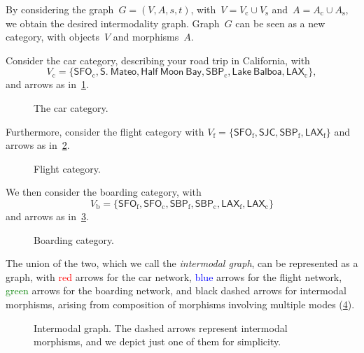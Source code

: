 By considering the graph~$G=(V,A,s,t)$, with~$V=V_\mathrm{c}\cup V_\mathrm{s}$ and~$A=A_\mathrm{c}\cup A_\mathrm{s}$, we obtain the desired intermodality graph. Graph~$G$ can be seen as a new category, with objects~$V$ and morphisms~$A$.
\begin{example}
Consider the car category, describing your road trip in California, with
\begin{equation*}
    V_\mathrm{c}=\{\mathsf{SFO}_\mathrm{c},\mathsf{S.}\ \mathsf{Mateo},\mathsf{Half} \ \mathsf{Moon}\ \mathsf{Bay},\mathsf{SBP}_\mathrm{c},\mathsf{Lake}\ \mathsf{Balboa},\mathsf{LAX}_\mathrm{c}\},
\end{equation*}
and arrows as in~\cref{fig:carcat}.

\begin{figure}[h!]
\begin{center}
\end{center}
\caption{The car category. \label{fig:carcat}}
\end{figure}

Furthermore, consider the flight category with $V_\mathrm{f}=\{\mathsf{SFO}_\mathrm{f},\mathsf{SJC},\mathsf{SBP}_\mathrm{f},\mathsf{LAX}_\mathrm{f}\}$ and arrows as in~\cref{fig:flight}.

\begin{figure}[h!]
\begin{center}
\end{center}
\caption{Flight category. \label{fig:flight}}
\end{figure}

We then consider the boarding category, with
\begin{equation*}
    V_\mathrm{b}=\{\mathsf{SFO}_\mathrm{f},\mathsf{SFO}_\mathrm{c},\mathsf{SBP}_\mathrm{f},\mathsf{SBP}_\mathrm{c},\mathsf{LAX}_\mathrm{f},\mathsf{LAX}_\mathrm{c}\}
\end{equation*}
and arrows as in~\cref{fig:boarding}.

\begin{figure}[h!]
\begin{center}
\end{center}
\caption{Boarding category. \label{fig:boarding}}
\end{figure}

The union of the two, which we call the \emph{intermodal graph}, can be represented as a graph, with \textcolor{red}{red} arrows for the car network, \textcolor{blue}{blue} arrows for the flight network, \textcolor{green}{green} arrows for the boarding network, and black dashed arrows for intermodal morphisms, arising from composition of morphisms involving multiple modes (\cref{fig:intermodal}).

\begin{figure}[h!]
\begin{center}
\end{center}
\caption{Intermodal graph. The dashed arrows represent intermodal morphisms, and we depict just one of them for simplicity. \label{fig:intermodal}}
\end{figure}
\end{example}

